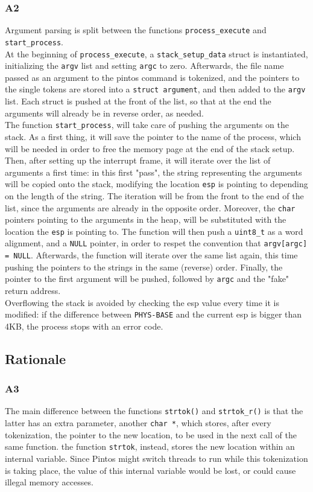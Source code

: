 \documentclass[a4wide, 11pt]{article}
\newcommand{\tx}{\texttt}
\begin{document}
\subsubsection{A2}
Argument parsing is split between the functions \tx{process\_execute} and \tx{start\_process}. \\
At the beginning of \tx{process\_execute}, a \tx{stack\_setup\_data} struct is instantiated, initializing the \tx{argv} list and setting \tx{argc} to zero. Afterwards, the file name passed as an argument to the pintos command is tokenized, and the pointers to the single tokens are stored into a \tx{struct argument}, and then added to the \tx{argv} list. Each struct is pushed at the front of the list, so that at the end the arguments will already be in reverse order, as needed. \\
The function \tx{start\_process}, will take care of pushing the arguments on the stack. As a first thing, it will save the pointer to the name of the process, which will be needed in order to free the memory page at the end of the stack setup. Then, after setting up the interrupt frame, it will iterate over the list of arguments a first time: in this first "pass", the string representing the arguments will be copied onto the stack, modifying the location \tx{esp} is pointing to depending on the length of the string. The iteration will be from the front to the end of the list, since the arguments are already in the opposite order. Moreover, the \tx{char} pointers pointing to the arguments in the heap, will be substituted with the location the \tx{esp} is pointing to. The function will then push a \tx{uint8\_t} as a word alignment, and a \tx{NULL} pointer, in order to respet the convention that \tx{argv[argc] = NULL}. Afterwards, the function will iterate over the same list again, this time pushing the pointers to the strings in the same (reverse) order. Finally, the pointer to the first argument will be pushed, followed by \tx{argc} and the "fake" return address. \\
Overflowing the stack is avoided by checking the esp value every time it is modified: if the difference between \tx{PHYS-BASE} and the current esp is bigger than 4KB, the process stops with an error code.   

\subsection{Rationale}
\subsubsection{A3}
The main difference between the functions \tx{strtok()} and \tx{strtok\_r()} is that the latter has an extra parameter, another \tx{char *}, which stores, after every tokenization, the pointer to the new location, to be used in the next call of the same function. the function \tx{strtok}, instead, stores the new location within an internal variable. Since Pintos might switch threads to run while this tokenization is taking place, the value of this internal variable would be lost, or could cause illegal memory accesses.
\end{document}

